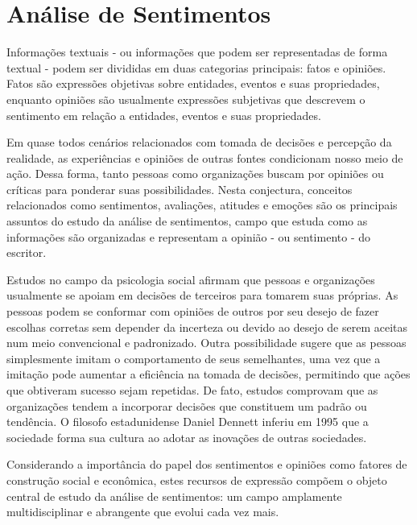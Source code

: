 \chapter[Análise de Sentimentos]{Análise de Sentimentos} \label{cap:cap1}
Informações textuais - ou informações que podem ser representadas de forma textual - podem ser divididas em duas categorias principais: fatos e opiniões. Fatos são expressões objetivas sobre entidades, eventos e suas propriedades, enquanto opiniões são usualmente expressões subjetivas que descrevem o sentimento em relação a entidades, eventos e suas propriedades.\cite{LiuSentAnaSubject} \par

Em quase todos cenários relacionados com tomada de decisões e percepção da realidade, as experiências e opiniões de outras fontes condicionam nosso meio de ação. Dessa forma, tanto pessoas como organizações buscam por opiniões ou críticas  para ponderar suas possibilidades. Nesta conjectura, conceitos relacionados como sentimentos, avaliações, atitudes e emoções são os principais assuntos do estudo da análise de sentimentos, campo que estuda como as informações são organizadas e representam a opinião - ou sentimento - do escritor. \cite{LiuBing} \par

Estudos no campo da psicologia social afirmam que  pessoas e organizações usualmente se apoiam em decisões de terceiros para tomarem suas próprias. As pessoas podem se conformar com opiniões de outros por seu desejo de fazer escolhas corretas sem depender da incerteza ou devido ao desejo de serem aceitas num meio convencional e padronizado. Outra possibilidade sugere que as pessoas simplesmente imitam o comportamento de seus semelhantes, uma vez que a imitação pode aumentar a eficiência na tomada de decisões, permitindo que ações que obtiveram sucesso sejam repetidas. De fato, estudos comprovam que as organizações tendem a incorporar decisões que constituem um padrão ou tendência. O filosofo estadunidense Daniel Dennett inferiu em 1995 que a sociedade forma sua cultura ao adotar as inovações de outras sociedades.\cite{PeopleLikeThis} \par

Considerando a importância do papel dos sentimentos e opiniões como fatores de construção social e econômica, estes recursos de expressão compõem o objeto central de estudo da análise de sentimentos: um campo amplamente multidisciplinar e abrangente que evolui cada vez mais. \par
